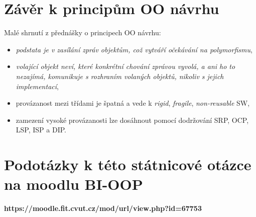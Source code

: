 \documentclass{szzclass}
\begin{document}
\section{Závěr k principům OO návrhu}

Malé shrnutí z přednášky o principech OO návrhu:

\begin{itemize}
      \item \textit{podstata je v zasílání zpráv objektům, což vytváří očekávání na polymorfismu},
      \item \textit{volající objekt neví, které konkrétní chování zprávou vyvolá, a ani ho to nezajímá,
      komunikuje s rozhraním volaných objektů, nikoliv s jejich implementací},
      \item provázanost mezi třídami je špatná a vede k \textit{rigid}, \textit{fragile}, \textit{non-reusable} SW,
      \item zamezení vysoké provázanosti lze dosáhnout pomocí dodržování SRP, OCP, LSP, ISP a DIP.
\end{itemize}


\section{Podotázky k této státnicové otázce na moodlu BI-OOP}

\textbf{https://moodle.fit.cvut.cz/mod/url/view.php?id=67753}
\end{document}
